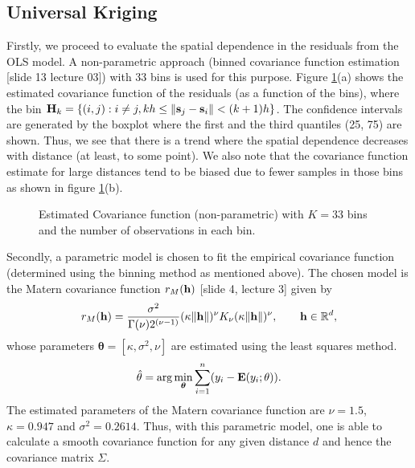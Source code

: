 \documentclass[a4paper,10pt]{article}
\def\bE{{\bf E}}
\def\bH{{\bf H}}
\def\bs{{\bf s}}
\def\bh{{\bf h}}
\def\btheta{{\boldsymbol \theta}}
\begin{document}
\subsection{Universal Kriging}
Firstly, we proceed to evaluate the spatial dependence in the residuals from the OLS model. A non-parametric approach (binned covariance function estimation [slide 13 lecture 03]) with 33 bins is used for this purpose. Figure \ref{fig:covnp}(a) shows the estimated covariance function of the residuals (as a function of the bins), where the bin $\bH_k = \{ (i,j): i \ne j, kh \le \| \bs_j - \bs_i \| < (k+1)h \}$. The confidence intervals are generated by the boxplot where the first and the third quantiles (25, 75) are shown. Thus, we see that there is a trend where the spatial dependence decreases with distance (at least, to some point). We also note that the covariance function estimate for large distances tend to be biased due to fewer samples in those bins as shown in figure  \ref{fig:covnp}(b).
\begin{figure}[ht]
\centering
  \qquad
  \caption{Estimated Covariance function (non-parametric) with $K = 33$ bins and the number of observations in each bin.}
\label{fig:covnp}
\end{figure}
Secondly, a parametric model is chosen to fit the empirical covariance function (determined using the binning method as mentioned above). The chosen model is the Matern covariance function $r_M(\bh)$ [slide 4, lecture 3] given by  
\begin{equation*}
r_M(\bh) = \frac{\sigma^2}{\Gamma(\nu) 2^{(\nu - 1)}} (\kappa \| \bh \|)^{\nu} K_{\nu}(\kappa \| \bh \|)^{\nu}, \qquad \bh \in \mathbb{R}^d,
\end{equation*}
whose parameters $\btheta = [\kappa, \sigma^2, \nu]$ are estimated using the least squares method.
\begin{equation*}
\hat \theta = \arg \min_{\btheta} \sum_{i=1}^n (y_i - \bE(y_i; \theta)).
\end{equation*}
The estimated parameters of the Matern covariance function are $\nu = 1.5$, $\kappa = 0.947$ and $\sigma^2 = 0.2614$. Thus, with this parametric model, one is able to calculate a smooth covariance function for any given distance $d$ and hence the covariance matrix $\Sigma$.
\end{document}

